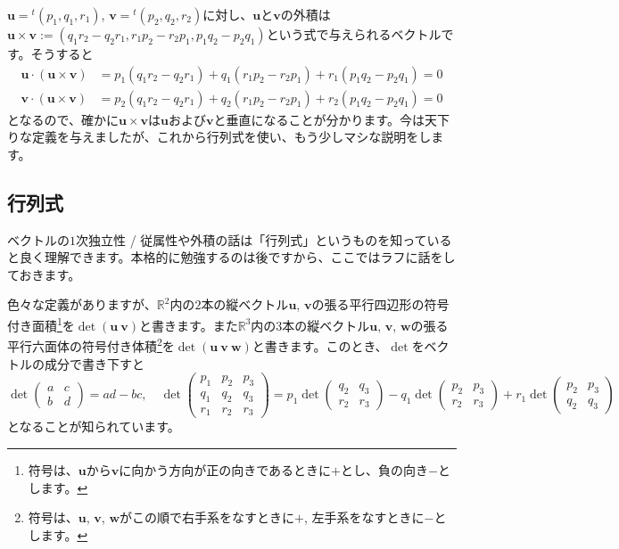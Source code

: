 $\bm{u} = {}^t(p_1, q_1, r_1)$, $\bm{v} = {}^t(p_2, q_2, r_2)$に対し、$\bm{u}$と$\bm{v}$の外積は$\bm{u}\times\bm{v} := (q_1 r_2-q_2 r_1, r_1 p_2-r_2 p_1, p_1 q_2-p_2 q_1)$という式で与えられるベクトルです。そうすると
\begin{align*}
\bm{u}\cdot(\bm{u}\times\bm{v})
&= p_1(q_1 r_2-q_2 r_1) +  q_1(r_1 p_2-r_2 p_1) + r_1(p_1 q_2-p_2 q_1) = 0\\
\bm{v}\cdot(\bm{u}\times\bm{v})
&= p_2(q_1 r_2-q_2 r_1) + q_2(r_1 p_2-r_2 p_1) + r_2(p_1 q_2-p_2 q_1) = 0
\end{align*}
となるので、確かに$\bm{u}\times\bm{v}$は$\bm{u}$および$\bm{v}$と垂直になることが分かります。今は天下りな定義を与えましたが、これから行列式を使い、もう少しマシな説明をします。

\subsection{行列式}

ベクトルの$1$次独立性 / 従属性や外積の話は「行列式」というものを知っていると良く理解できます。本格的に勉強するのは後ですから、ここではラフに話をしておきます。

色々な定義がありますが、$\mathbb{R}^2$内の$2$本の縦ベクトル$\bm{u}$, $\bm{v}$の張る平行四辺形の符号付き面積\footnote{符号は、$\bm{u}$から$\bm{v}$に向かう方向が正の向きであるときに$+$とし、負の向き$-$とします。}を$\det( \bm{u} \  \bm{v} )$と書きます。また$\mathbb{R}^3$内の$3$本の縦ベクトル$\bm{u}$, $\bm{v}$, $\bm{w}$の張る平行六面体の符号付き体積\footnote{符号は、$\bm{u}$, $\bm{v}$, $\bm{w}$がこの順で右手系をなすときに$+$, 左手系をなすときに$-$とします。}を$\det( \bm{u} \ \bm{v} \ \bm{w})$と書きます。このとき、$\det$をベクトルの成分で書き下すと
\[
\det
\begin{pmatrix}
a & c \\
b & d 
\end{pmatrix}
= ad-bc, \quad
\det
\begin{pmatrix}
p_1 & p_2 & p_3 \\
q_1 & q_2 & q_3 \\
r_1 & r_2 & r_3
\end{pmatrix}
=
p_1 \det
\begin{pmatrix}
q_2 & q_3 \\
r_2 & r_3
\end{pmatrix}
-
q_1 \det
\begin{pmatrix}
p_2 & p_3 \\
r_2 & r_3
\end{pmatrix}
+
r_1 \det
\begin{pmatrix}
p_2 & p_3 \\
q_2 & q_3
\end{pmatrix}
\]
となることが知られています。

